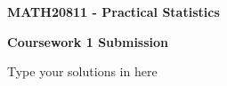 \documentclass[11pt,a4]{article}
\begin{document}
	
\begin{center}
	\bf{\Large{MATH20811 - Practical Statistics}} 
	\bigskip
	\bigskip
	
		\bf{\Large{Coursework 1 Submission}} 
\end{center}	

\bigskip
\bigskip
	
	
	
	
Type your solutions in here	
	
\end{document}
